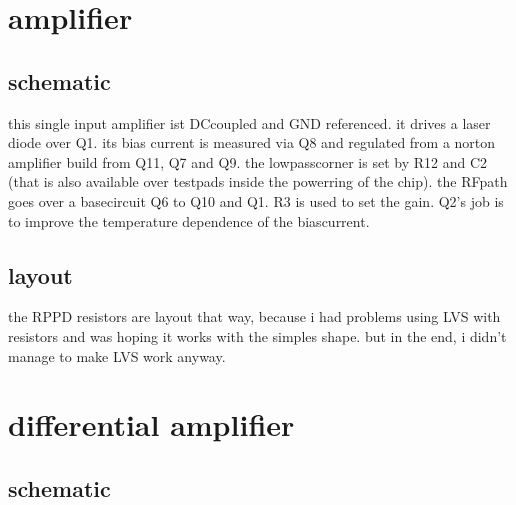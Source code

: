 \documentclass[letterpaper,10pt,english]{sphinxmanual}
\begin{document}
\sphinxstepscope


\chapter{amplifier}
\label{\detokenize{amplifiers:amplifier}}\label{\detokenize{amplifiers::doc}}

\section{schematic}
\label{\detokenize{amplifiers:schematic}}

\sphinxAtStartPar
this single input amplifier ist DC\sphinxhyphen{}coupled and GND referenced. it drives a laser diode over Q1. its bias current is measured via Q8 and regulated from a norton amplifier build from Q11, Q7 and Q9. the low\sphinxhyphen{}pass\sphinxhyphen{}corner is set by R12 and C2 (that is also available over test\sphinxhyphen{}pads inside the power\sphinxhyphen{}ring of the chip).
the RF\sphinxhyphen{}path goes over a base\sphinxhyphen{}circuit Q6 to Q10 and Q1. R3 is used to set the gain.
Q2’s job is to improve the temperature dependence of the bias\sphinxhyphen{}current.


\section{layout}
\label{\detokenize{amplifiers:layout}}

\sphinxAtStartPar
the RPPD resistors are layout that way, because i had problems using LVS with resistors and was hoping it works with the simples shape. but in the end, i didn’t manage to make LVS work anyway.


\chapter{differential amplifier}
\label{\detokenize{amplifiers:differential-amplifier}}

\section{schematic}
\label{\detokenize{amplifiers:id1}}
\end{document}
